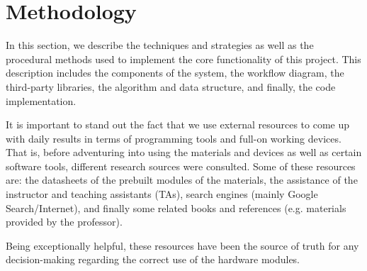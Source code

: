 %
%
%


\section{Methodology}
In this section, we describe the techniques and strategies as well as the procedural methods used to implement the core functionality of this project. This description includes the components of the system, the workflow diagram, the third-party libraries, the algorithm and data structure, and finally, the code implementation.

It is important to stand out the fact that we use external resources to come up with daily results in terms of programming tools and full-on working devices. That is, before adventuring into using the materials and devices as well as certain software tools, different research sources were consulted. Some of these resources are: the datasheets of the prebuilt modules of the materials, the assistance of the instructor and teaching assistants (TAs), search engines (mainly Google Search/Internet), and finally some related books and references (e.g. materials provided by the professor).

Being exceptionally helpful, these resources have been the source of truth for any decision-making regarding the correct use of the hardware modules.

